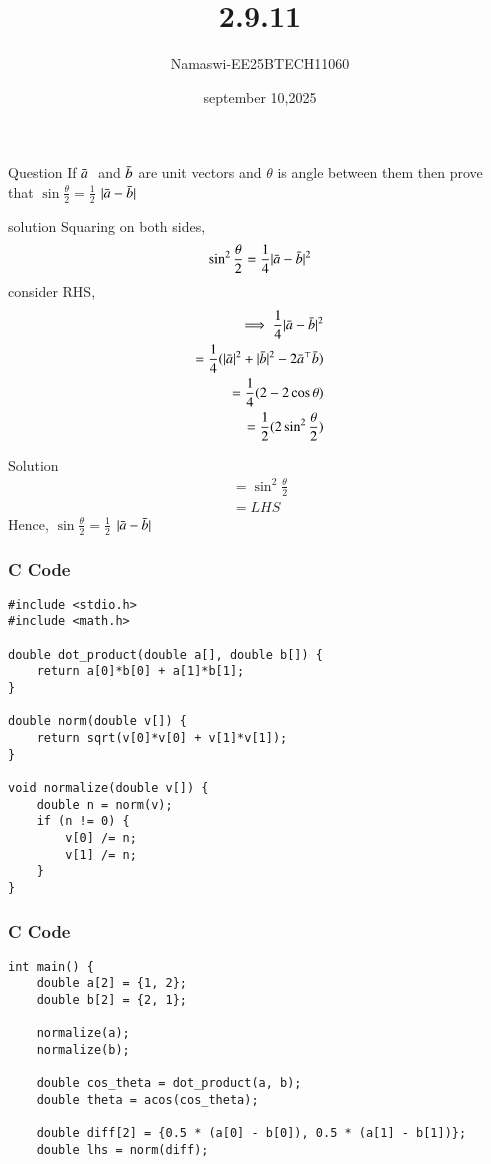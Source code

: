 \documentclass{beamer}
\begin{document}
\title 
{2.9.11}
\date{september 10,2025}
\author 
{Namaswi-EE25BTECH11060}
\frame{\titlepage}
\begin{frame}{Question}
If $\Bar{a} \;$ and \;$ \Bar{b} $ are unit vectors and $\theta$ is angle between them then prove that $\sin\frac{\theta}{2}=\frac{1}{2}$ $| {\Bar{a}-\Bar{b}}|$
\end{frame}
\begin{frame}{solution}
Squaring on both sides,\\
\begin{align*}
    \sin^2\frac{\theta}{2}=\frac{1}{4}| {\Bar{a}-\Bar{b}}|^2\\
    \end{align*}
  consider RHS,\\
\begin{align}
 \implies \frac{1}{4}| {\Bar{a}-\Bar{b}}|^2\\
  =\frac{1}{4}( |\Bar{a}|^2+|\Bar{b}|^2-2\Bar{a}^\top\Bar{b})\\
  =\frac{1}{4}(2-2\cos \theta)\\
  =\frac{1}{2}(2\sin^2{\frac{\theta}{2}})\\
  \end{align}
  \end{frame}
  \begin{frame}{Solution}
  \begin{align}
=\sin^2\frac{\theta}{2}\\
=LHS
\end{align}
Hence, $\sin\frac{\theta}{2}=\frac{1}{2}$  $| {\Bar{a}-\Bar{b}}|
$ 
\end{frame}
 
\begin{frame}[fragile]
\frametitle{C Code }
\begin{lstlisting}
#include <stdio.h>
#include <math.h>

double dot_product(double a[], double b[]) {
    return a[0]*b[0] + a[1]*b[1];
}

double norm(double v[]) {
    return sqrt(v[0]*v[0] + v[1]*v[1]);
}

void normalize(double v[]) {
    double n = norm(v);
    if (n != 0) {
        v[0] /= n;
        v[1] /= n;
    }
}
\end{lstlisting}
\end{frame}

\begin{frame}[fragile]
    \frametitle{C Code}
    \begin{lstlisting}
int main() {
    double a[2] = {1, 2};
    double b[2] = {2, 1};

    normalize(a);
    normalize(b);

    double cos_theta = dot_product(a, b);
    double theta = acos(cos_theta); 

    double diff[2] = {0.5 * (a[0] - b[0]), 0.5 * (a[1] - b[1])};
    double lhs = norm(diff);
\end{lstlisting}
\end{frame}
\end{document}
